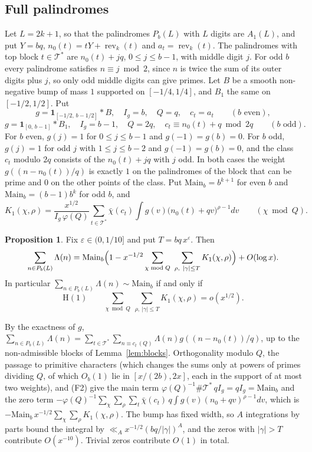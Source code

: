 \documentclass[11pt]{amsart}
\makeatletter
\theoremstyle{definition}
\newtheorem{proposition}[theorem]{Proposition}
\numberwithin{equation}{section}
\renewenvironment{proof}[1][\proofname]{\par\pushQED{\qed}\normalfont\topsep6\p@\@plus6\p@\relax\trivlist\item[\hskip\labelsep\upshape#1.]\ignorespaces}{\popQED\endtrivlist\@endpefalse}
\newcommand{\rev}{\operatorname{rev}}
\newcommand{\cT}{\mathcal{T}}
\newcommand{\Main}{\mathrm{Main}}
\makeatother
\begin{document}
\subsection{Full palindromes}
Let $L=2k+1$, so that the palindromes $P_b(L)$ with $L$ digits are $A_1(L)$, and put $Y=bq$, $n_0(t)=tY+\rev_k(t)$ and $a_t=\rev_k(t)$. The palindromes with top block $t\in\cT^*$ are $n_0(t)+jq$, $0\le j\le b-1$, with middle digit $j$. For odd $b$ every palindrome satisfies $n\equiv j\bmod 2$, since $n$ is twice the sum of its outer digits plus $j$, so only odd middle digits can give primes. Let $B$ be a smooth non-negative bump of mass $1$ supported on $[-1/4,1/4]$, and $B_1$ the same on $[-1/2,1/2]$. Put
\[
g=\mathbf 1_{[-1/2,\,b-1/2]}*B,\quad I_g=b,\quad Q=q,\quad c_t=a_t\qquad(b\text{ even}),
\]
\[
g=\mathbf 1_{[0,\,b-1]}*B_1,\quad I_g=b-1,\quad Q=2q,\quad c_t\equiv n_0(t)+q\bmod 2q\qquad(b\text{ odd}).
\]
For $b$ even, $g(j)=1$ for $0\le j\le b-1$ and $g(-1)=g(b)=0$. For $b$ odd, $g(j)=1$ for odd $j$ with $1\le j\le b-2$ and $g(-1)=g(b)=0$, and the class $c_t$ modulo $2q$ consists of the $n_0(t)+jq$ with $j$ odd. In both cases the weight $g((n-n_0(t))/q)$ is exactly $1$ on the palindromes of the block that can be prime and $0$ on the other points of the class. Put $\Main_b=b^{k+1}$ for even $b$ and $\Main_b=(b-1)b^k$ for odd $b$, and
\[
K_1(\chi,\rho)=\frac{x^{1/2}}{I_g\,\varphi(Q)}\sum_{t\in\cT^*}\bar\chi(c_t)\int g(v)\bigl(n_0(t)+qv\bigr)^{\rho-1}dv\qquad(\chi\bmod Q).
\]

\begin{proposition}\label{prop:pal}
Fix $\varepsilon\in(0,1/10]$ and put $T=bq\,x^{\varepsilon}$. Then
\[
\sum_{n\in P_b(L)}\Lambda(n)=\Main_b\Bigl(1-x^{-1/2}\sum_{\chi\bmod Q}\ \sum_{\rho,\ |\gamma|\le T}K_1(\chi,\rho)\Bigr)+O(\log x).
\]
In particular $\sum_{n\in P_b(L)}\Lambda(n)\sim\Main_b$ if and only if
\[
\mathrm{H}(1)\qquad\sum_{\chi\bmod Q}\ \sum_{\rho,\ |\gamma|\le T}K_1(\chi,\rho)=o(x^{1/2}).
\]
\end{proposition}

\begin{proof}
By the exactness of $g$, $\sum_{n\in P_b(L)}\Lambda(n)=\sum_{t\in\cT^*}\sum_{n\equiv c_t\,(Q)}\Lambda(n)g((n-n_0(t))/q)$, up to the non-admissible blocks of Lemma~\ref{lem:blocks}. Orthogonality modulo $Q$, the passage to primitive characters (which changes the sums only at powers of primes dividing $Q$, of which $O_b(1)$ lie in $[x/(2b),2x]$, each in the support of at most two weights), and (F2) give the main term $\varphi(Q)^{-1}\#\cT^*\,qI_g=qI_g=\Main_b$ and the zero term $-\varphi(Q)^{-1}\sum_\chi\sum_\rho\sum_t\bar\chi(c_t)\,q\int g(v)(n_0+qv)^{\rho-1}dv$, which is $-\Main_b\,x^{-1/2}\sum_\chi\sum_\rho K_1(\chi,\rho)$. The bump has fixed width, so $A$ integrations by parts bound the integral by $\ll_A x^{-1/2}(bq/|\gamma|)^A$, and the zeros with $|\gamma|>T$ contribute $O(x^{-10})$. Trivial zeros contribute $O(1)$ in total.
\end{proof}
\end{document}
